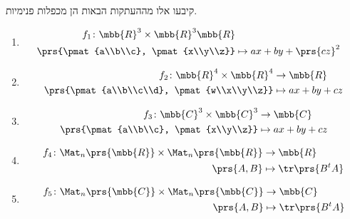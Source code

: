 \documentclass[a4paper,10pt,twoside,openany]{book}
\begin{document}
\begin{exercisechap}
קיבעו אלו מההעתקות הבאות הן מכפלות פנימיות.

\begin{enumerate}
\item
\begin{align*}
f_1 \colon \mbb{R}^3 \times \mbb{R}^3 \mbb{R} \\
\prs{\pmat{a\\b\\c}, \pmat{x\\y\\z}} &\mapsto ax + by + \prs{cz}^2
\end{align*}

\item
\begin{align*}
f_2 \colon \mbb{R}^4 \times \mbb{R}^4 &\to \mbb{R} \\
\prs{\pmat{a\\b\\c\\d}, \pmat{w\\x\\y\\z}} &\mapsto ax + by + cz 
\end{align*}

\item
\begin{align*}
f_3 \colon \mbb{C}^3 \times \mbb{C}^3 &\to \mbb{C} \\
\prs{\pmat{a\\b\\c}, \pmat{x\\y\\z}} &\mapsto ax + by + cz
\end{align*}

\item
\begin{align*}
f_4 \colon \Mat_n\prs{\mbb{R}} \times \Mat_n\prs{\mbb{R}} &\to \mbb{R} \\
\prs{A,B} &\mapsto \tr\prs{B^t A}
\end{align*}

\item
\begin{align*}
f_5 \colon \Mat_n\prs{\mbb{C}} \times \Mat_n\prs{\mbb{C}} &\to \mbb{C} \\
\prs{A,B} &\mapsto \tr\prs{B^t A}
\end{align*}
\end{enumerate}
\end{exercisechap}
\end{document}
